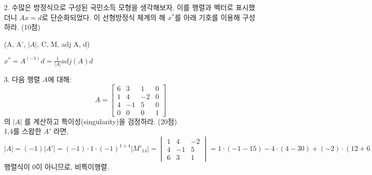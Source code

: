 \documentclass[aspectratio=169]{beamer}
\begin{document}
\begin{frame}
  2. 수많은 방정식으로 구성된 국민소득 모형을 생각해보자. 이를 행렬과 벡터로 표시했더니 \( Ax = d \)로 단순화되었다.
이 선형방정식 체계의 해 \( x^* \)를 아래 기호를 이용해 구성하라. (10점)

(A, A', $|A|$, C, M, adj A, d)

  $ x^* = A^{(-1)}d = \frac{1}{|A|} adj(A) d $

\end{frame}


\begin{frame}
  3. 다음 행렬 \( A \)에 대해:
    \[
    A = \begin{bmatrix}
        6 &  3  &  1 &  0    \\
        1 &  4  & -2 &  0   \\
        4 & -1  &  5 &  0    \\
        0 &  0  &  0 &  1
    \end{bmatrix}
    \]
    의 $|A|$ 를 계산하고 특이성(singularity)을 검정하라. (20점) \\

    1,4를 스왑한 $A'$ 라면, \\
    $|A| = (-1) |A'| = (-1) \cdot 1 \cdot (-1)^{1+4} |M'_{14}| = 
    \begin{vmatrix}
      1 &  4  & -2    \\
      4 & -1  &  5     \\
      6 &  3  &  1    
  \end{vmatrix} 
  = 1\cdot (-1-15) - 4 \cdot (4-30) + (-2) \cdot (12+6) = 52
    $ \\
    행렬식이 0이 아니므로, 비특이행렬.

    

\end{frame}
\end{document}
